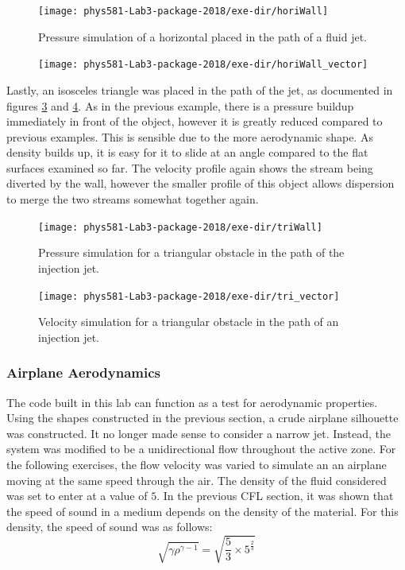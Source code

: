 \documentclass[twocolumn]{article}
\begin{document}
\begin{figure}
\centering
\texttt{[image: phys581-Lab3-package-2018/exe-dir/horiWall]}
\caption{Pressure simulation of a horizontal placed in the path of a fluid jet.}
\label{fig:horiWall}
\end{figure}

\begin{figure}
\centering
\texttt{[image: phys581-Lab3-package-2018/exe-dir/horiWall\_vector]}
\caption{}
\label{fig:horiWall_vector}
\end{figure}

Lastly, an isosceles triangle was placed in the path of the jet, as documented in figures \ref{fig:triWall} and \ref{fig:tri_vector}. As in the previous example, there is a pressure buildup immediately in front of the object, however it is greatly reduced compared to previous examples. This is sensible due to the more aerodynamic shape. As density builds up, it is easy for it to slide at an angle compared to the flat surfaces examined so far. The velocity profile again shows the stream being diverted by the wall, however the smaller profile of this object allows dispersion to merge the two streams somewhat together again.

\begin{figure}
\centering
\texttt{[image: phys581-Lab3-package-2018/exe-dir/triWall]}
\caption{Pressure simulation for a triangular obstacle in the path of the injection jet.}
\label{fig:triWall}
\end{figure}

\begin{figure}
\centering
\texttt{[image: phys581-Lab3-package-2018/exe-dir/tri\_vector]}
\caption{Velocity simulation for a triangular obstacle in the path of an injection jet.}
\label{fig:tri_vector}
\end{figure}
 

\subsubsection{Airplane Aerodynamics}
The code built in this lab can function as a test for aerodynamic properties. Using the shapes constructed in the previous section, a crude airplane silhouette was constructed. It no longer made sense to consider a narrow jet. Instead, the system was modified to be a unidirectional flow throughout the active zone. For the following exercises, the flow velocity was varied to simulate an an airplane moving at the same speed through the air. The density of the fluid considered was set to enter at a value of $5$. In the previous CFL section, it was shown that the speed of sound in a medium depends on the density of the material. For this density, the speed of sound was as follows:
\begin{equation}
\sqrt{\gamma \rho^{\gamma-1}} = \sqrt{\frac{5}{3} \times 5^{\frac{2}{3}}}
\end{equation}
\end{document}
